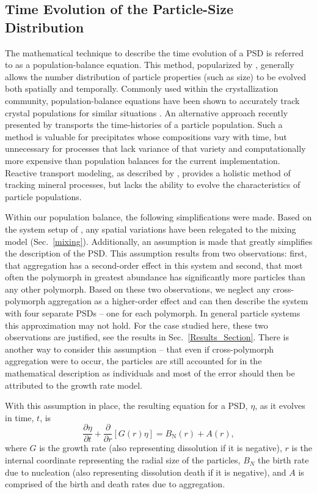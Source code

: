 \documentclass[preprint,3p,a4paper,times,12pt,authoryear]{elsarticle}
\begin{document}
\subsection{Time Evolution of the Particle-Size Distribution}
\label{PBE_Section}
The mathematical technique to describe the time evolution of a PSD is referred to as a population-balance equation. This method, popularized by \citet{Randolph1971}, generally allows the number distribution of particle properties (such as size) to be evolved both spatially and temporally. Commonly used within the crystallization community, population-balance equations have been shown to accurately track crystal populations for similar situations \citep{Chiang1988,Steefel1990,Hostomsky1991}.  An alternative approach recently presented by \citep{Noguera2006a,Noguera2006b} transports the time-histories of a particle population.  Such a method is valuable for precipitates whose compositions vary with time, but unnecessary for processes that lack variance of that variety and computationally more expensive than population balances for the current implementation.  Reactive transport modeling, as described by \citet{Steefel2005}, provides a holistic method of tracking mineral processes, but lacks the ability to evolve the characteristics of particle populations. 

Within our population balance, the following simplifications were made.  Based on the system setup of \citet{Ogino1987}, any spatial variations have been relegated to the mixing model (Sec.~\ref{mixing}).  Additionally, an assumption is made that greatly simplifies the description of the PSD. This assumption results from two observations: first, that aggregation has a second-order effect in this system and second, that most often the polymorph in greatest abundance has significantly more particles than any other polymorph. Based on these two observations, we neglect any cross-polymorph aggregation as a higher-order effect and can then describe the system with four separate PSDs -- one for each polymorph. In general particle systems this approximation may not hold. For the case studied here, these two observations are justified, see the results in Sec.~\ref{Results_Section}. There is another way to consider this assumption -- that even if cross-polymorph aggregation were to occur, the particles are still accounted for in the mathematical description as individuals and most of the error should then be attributed to the growth rate model.

With this assumption in place, the resulting equation for a PSD, $\eta$, as it evolves in time, $t$, is
\begin{equation}\label{generalpopulationbalance}
\frac{\partial \eta}{\partial t} + \frac{\partial}{\partial r}[G(r)\eta] =  B_{\text{N}}(r) + A(r),
\end{equation}  
where $G$ is the growth rate (also representing dissolution if it is negative), $r$ is the internal coordinate representing the radial size of the particles, $B_N$ the birth rate due to nucleation (also representing dissolution death if it is negative), and $A$ is comprised of the birth and death rates due to aggregation.
\end{document}
